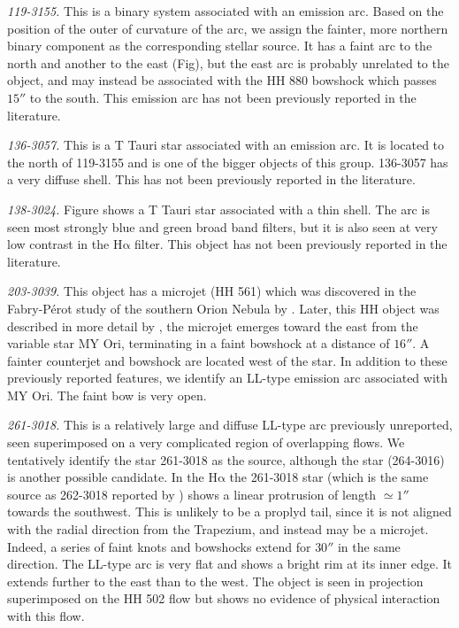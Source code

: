 \documentclass[iop, apj]{emulateapj}
\newcommand\ha{\ensuremath{\mathrm{H\alpha}}}
\begin{document}
\textit{119-3155.} This is a binary system  associated with an emission arc. Based on the position of the outer of curvature of the arc, we assign the fainter, more northern binary component as the corresponding stellar source. It has a faint arc to the north and another to the east (Fig), but  the east arc is probably unrelated to the object, and may instead be associated with the HH 880 bowshock which passes \(15''\) to the south. This emission arc has not been previously reported in the literature.     

\textit{136-3057.} This is a T Tauri star associated with an emission arc. It is located to the north of 119-3155 and is one of the bigger objects of this group. 136-3057 has a very diffuse shell. This has not been previously reported in the literature.

\textit{138-3024.} Figure shows a T Tauri star associated with a thin shell. The arc is seen most strongly blue and green broad band filters, but it is also seen at very low contrast in the \ha{} filter. This object has not been previously reported in the literature.

\textit{203-3039.} This object has a microjet (HH 561) which was discovered in the Fabry-Pérot study of the southern Orion Nebula by \citet{Bally:2001a}. Later, this HH object was described in more detail by \citet{Bally:2006a}, the microjet emerges toward the east from the variable star MY Ori, terminating in a faint bowshock at a distance of \(16''\). A fainter counterjet and bowshock are located west of the star. In addition to these previously reported features, we identify an LL-type emission arc associated with MY Ori. The faint bow is very open.

\textit{261-3018.} This is a relatively large and diffuse LL-type arc previously unreported, seen superimposed on a very complicated region of overlapping flows. We tentatively identify the star 261-3018 as the source, although the star (264-3016) is another possible candidate. In the \ha{} the 261-3018 star (which is the same source as 262-3018 reported by \citealp{Bally:2006a})  shows a linear protrusion of length \(\simeq1''\) towards the southwest. This is unlikely to be a proplyd tail, since it is not aligned with the radial direction from the Trapezium, and instead may be a microjet. Indeed, a series of faint knots and bowshocks extend for \(30''\) in the same direction. The LL-type arc is very flat and shows a bright rim at its inner edge. It extends further to the east than to the west. The object is seen in projection superimposed on the HH 502 flow but shows no evidence of physical interaction with this flow. 
\end{document}

